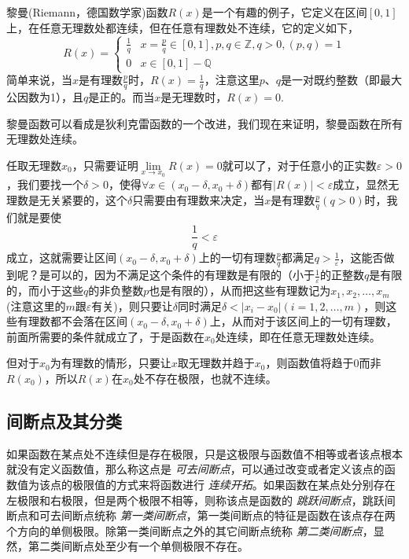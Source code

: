 \begin{example}
  \label{example:continuous-of-riemann-function}
  黎曼(Riemann，德国数学家)函数$R(x)$是一个有趣的例子，它定义在区间$[0,1]$上，在任意无理数处都连续，但在任意有理数处不连续，它的定义如下，
  \[ R(x) =
    \begin{cases}
      \frac{1}{q} & x=\frac{p}{q} \in [0,1], p,q \in \mathbb{Z}, q >0, (p,q)=1 \\
      0 & x \in [0,1]-\mathbb{Q}
    \end{cases}
  \]
  简单来说，当$x$是有理数$\frac{p}{q}$时，$R(x)=\frac{1}{q}$，注意这里$p$、$q$是一对既约整数（即最大公因数为1），且$q$是正的。而当$x$是无理数时，$R(x)=0$.

  黎曼函数可以看成是狄利克雷函数的一个改进，我们现在来证明，黎曼函数在所有无理数处连续。

  任取无理数$x_0$，只需要证明$\lim\limits_{x \to x_0} R(x)=0$就可以了，对于任意小的正实数$\varepsilon>0$，我们要找一个$\delta>0$，使得$\forall x \in (x_0-\delta,x_0+\delta)$都有$|R(x)|<\varepsilon$成立，显然无理数是无关紧要的，这个$\delta$只需要由有理数来决定，当$x$是有理数$\frac{p}{q}(q>0)$时，我们就是要使
  \[ \frac{1}{q} < \varepsilon \]
  成立，这就需要让区间$(x_0-\delta,x_0+\delta)$上的一切有理数$\frac{p}{q}$都满足$q > \frac{1}{\varepsilon}$，这能否做到呢？是可以的，因为不满足这个条件的有理数是有限的（小于$\frac{1}{\varepsilon}$的正整数$q$是有限的，而小于这些$q$的非负整数$p$也是有限的），从而把这些有理数记为$x_1,x_2,\ldots,x_m$(注意这里的$m$跟$\varepsilon$有关)，则只要让$\delta$同时满足$\delta < |x_i-x_0|(i=1,2,\ldots,m)$，则这些有理数都不会落在区间$(x_0-\delta,x_0+\delta)$上，从而对于该区间上的一切有理数，前面所需要的条件就成立了，于是函数在$x_0$处连续，即在任意无理数处连续。

  但对于$x_0$为有理数的情形，只要让$x$取无理数并趋于$x_0$，则函数值将趋于0而非$R(x_0)$，所以$R(x)$在$x_0$处不存在极限，也就不连续。
\end{example}

\subsection{间断点及其分类}
\label{sec:discontinuity-point-and-its-category}

如果函数在某点处不连续但是存在极限，只是这极限与函数值不相等或者该点根本就没有定义函数值，那么称这点是 \emph{可去间断点}，可以通过改变或者定义该点的函数值为该点的极限值的方式来将函数进行 \emph{连续开拓}。如果函数在某点处分别存在左极限和右极限，但是两个极限不相等，则称该点是函数的 \emph{跳跃间断点}，跳跃间断点和可去间断点统称 \emph{第一类间断点}，第一类间断点的特征是函数在该点存在两个方向的单侧极限。除第一类间断点之外的其它间断点统称 \emph{第二类间断点}，显然，第二类间断点处至少有一个单侧极限不存在。

